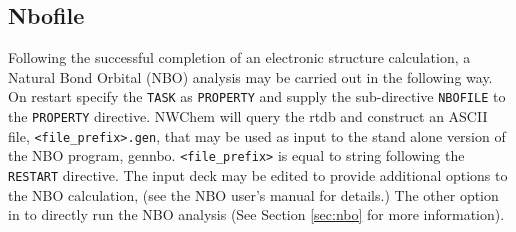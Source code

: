 \subsection{Nbofile}
\label{sec:Nbofile}

Following the successful completion of an electronic structure
calculation, a Natural Bond Orbital (NBO) analysis may be carried out
in the following way.  On restart specify the \verb+TASK+ as \verb+PROPERTY+ and
supply the sub-directive \verb+NBOFILE+ to the \verb+PROPERTY+ directive.  NWChem
will query the rtdb and construct an ASCII file,
\verb+<file_prefix>.gen+, that may be used as input to the stand alone
version of the NBO program, gennbo.  \verb+<file_prefix>+ is equal to
string following the \verb+RESTART+ directive.  The input deck may be edited
to provide additional options to the NBO calculation, (see the NBO
user's manual for details.)  The other option in to directly run the NBO 
analysis (See Section \ref{sec:nbo} for more information).

